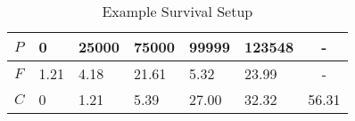 \begin{table}[h!]
  \centering
  \caption{Example Survival Setup}\label{table-survival-example}
  \begin{tabular}{l | lllllc}
    $P$      & 0    & 25000 & 75000 & 99999 & 123548 & - \\ \hline
    $F$      & 1.21 & 4.18  & 21.61 & 5.32  & 23.99  & - \\ \hline
    $C$      & 0    & 1.21  & 5.39  & 27.00 & 32.32  & 56.31
  \end{tabular}
\end{table}
